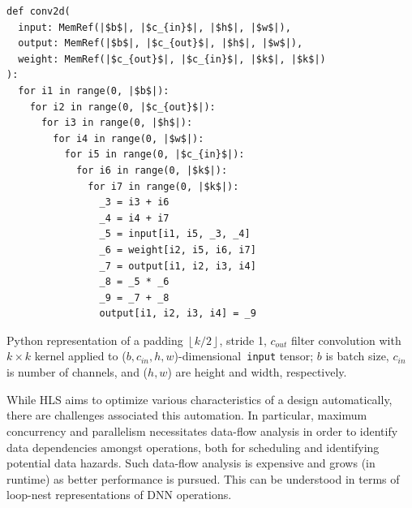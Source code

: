 \documentclass[10pt]{sig-alternate}
\begin{document}
\begin{listing}
\begin{verbatim}
def conv2d(
  input: MemRef(|$b$|, |$c_{in}$|, |$h$|, |$w$|),
  output: MemRef(|$b$|, |$c_{out}$|, |$h$|, |$w$|),
  weight: MemRef(|$c_{out}$|, |$c_{in}$|, |$k$|, |$k$|)
):
  for i1 in range(0, |$b$|):
    for i2 in range(0, |$c_{out}$|):
      for i3 in range(0, |$h$|):
        for i4 in range(0, |$w$|):
          for i5 in range(0, |$c_{in}$|):
            for i6 in range(0, |$k$|):
              for i7 in range(0, |$k$|):
                _3 = i3 + i6
                _4 = i4 + i7
                _5 = input[i1, i5, _3, _4]
                _6 = weight[i2, i5, i6, i7]
                _7 = output[i1, i2, i3, i4]
                _8 = _5 * _6
                _9 = _7 + _8
                output[i1, i2, i3, i4] = _9
\end{verbatim}
\caption{Python representation of a padding $\left\lfloor k/2\right\rfloor $,
stride 1, $c_{out}$ filter convolution with $k\times k$ kernel applied
to ($\ensuremath{b},\ensuremath{c_{in}},\ensuremath{h},\ensuremath{w}$)-dimensional\texttt{
input} tensor; $b$ is batch size, $c_{in}$ is number
of channels, and ($h,w$) are height and width, respectively.\label{lis:Single-filter-convolution}}
\end{listing}

While HLS aims to optimize various characteristics of
a design automatically, there are challenges associated this automation. In particular, maximum concurrency and parallelism necessitates
data-flow analysis in order to identify data dependencies amongst
operations, both for scheduling and identifying potential data hazards.
Such data-flow analysis is expensive and grows (in runtime) as better
performance is pursued. This can be understood in terms of loop-nest
representations of DNN operations.
\end{document}

